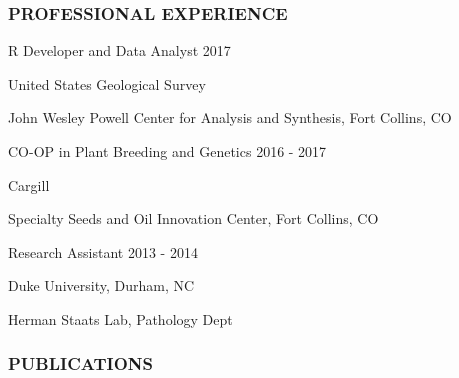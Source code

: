 \documentclass[12pt,english]{article}
\begin{document}

\subsubsection*{PROFESSIONAL EXPERIENCE}
\vspace{-0.5ex}\par

\hspace{1.0em} R Developer and Data Analyst
\hfill 
2017
\vspace{-0.5ex}\par
\hspace{2.0em} United States Geological Survey
\vspace{-0.5ex}\par
\hspace{2.0em} John Wesley Powell Center for Analysis and Synthesis, Fort Collins, CO
\hfill 
\vspace{0.5em}\par

\hspace{1.0em} CO-OP in Plant Breeding and Genetics
\hfill 
2016 - 2017
\vspace{-0.5ex}\par
\hspace{2.0em} Cargill
\vspace{-0.5ex}\par
\hspace{2.0em} Specialty Seeds and Oil Innovation Center, Fort Collins, CO
\vspace{0.5em}\par

\hspace{1.0em} Research Assistant
\hfill 
2013 - 2014
\vspace{-0.5ex}\par
\hspace{2.0em} Duke University, Durham, NC
\vspace{-0.5ex}\par
\hspace{2.0em} Herman Staats Lab, Pathology Dept

\vspace{0.5em}\par

\subsubsection*{PUBLICATIONS}
\vspace{-0.5ex}
\end{document}
